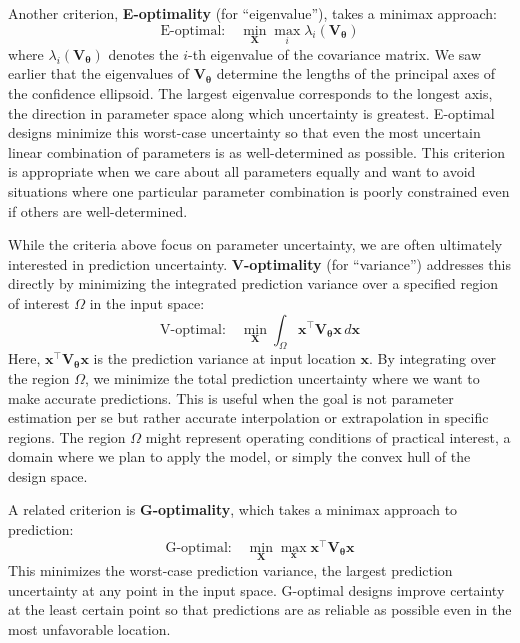 Another criterion, \textbf{E-optimality} (for ``eigenvalue''), takes a minimax approach:
\begin{equation}
    \text{E-optimal:} \quad \min_{\mathbf{X}} \max_{i} \lambda_i(\mathbf{V}_{\boldsymbol{\theta}})
\end{equation}
where $\lambda_i(\mathbf{V}_{\boldsymbol{\theta}})$ denotes the $i$-th eigenvalue of the covariance matrix. We saw earlier that the eigenvalues of $\mathbf{V}_{\boldsymbol{\theta}}$ determine the lengths of the principal axes of the confidence ellipsoid. The largest eigenvalue corresponds to the longest axis, the direction in parameter space along which uncertainty is greatest. E-optimal designs minimize this worst-case uncertainty so that even the most uncertain linear combination of parameters is as well-determined as possible. This criterion is appropriate when we care about all parameters equally and want to avoid situations where one particular parameter combination is poorly constrained even if others are well-determined.

While the criteria above focus on parameter uncertainty, we are often ultimately interested in prediction uncertainty. \textbf{V-optimality} (for ``variance'') addresses this directly by minimizing the integrated prediction variance over a specified region of interest $\Omega$ in the input space:
\begin{equation}
    \text{V-optimal:} \quad \min_{\mathbf{X}} \int_{\Omega} \mathbf{x}^\top \mathbf{V}_{\boldsymbol{\theta}} \mathbf{x} \, d\mathbf{x}
\end{equation}
Here, $\mathbf{x}^\top \mathbf{V}_{\boldsymbol{\theta}} \mathbf{x}$ is the prediction variance at input location $\mathbf{x}$. By integrating over the region $\Omega$, we minimize the total prediction uncertainty where we want to make accurate predictions. This is useful when the goal is not parameter estimation per se but rather accurate interpolation or extrapolation in specific regions. The region $\Omega$ might represent operating conditions of practical interest, a domain where we plan to apply the model, or simply the convex hull of the design space.

A related criterion is \textbf{G-optimality}, which takes a minimax approach to prediction:
\begin{equation}
    \text{G-optimal:} \quad \min_{\mathbf{X}} \max_{\mathbf{x}} \mathbf{x}^\top \mathbf{V}_{\boldsymbol{\theta}} \mathbf{x}
\end{equation}
This minimizes the worst-case prediction variance, the largest prediction uncertainty at any point in the input space. G-optimal designs improve certainty at the least certain point so that predictions are as reliable as possible even in the most unfavorable location.

